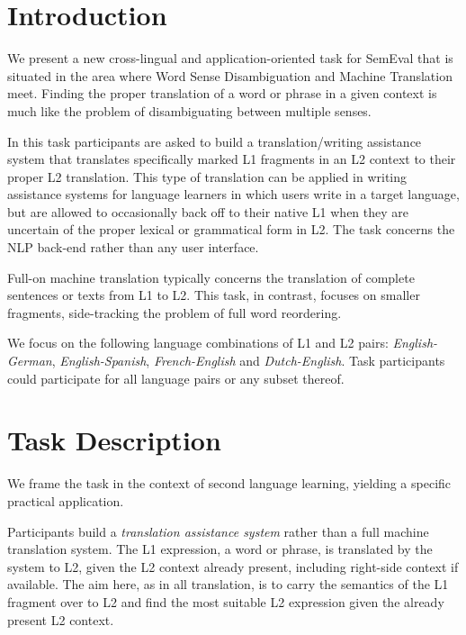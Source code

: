 \section{Introduction} %


We present a new cross-lingual and application-oriented task for SemEval that
is situated in the area where Word Sense Disambiguation and Machine Translation
meet. Finding the proper translation of a word or phrase in a given context is
much like the problem of disambiguating between multiple senses.

In this task participants are asked to build a translation/writing assistance
system that translates specifically marked L1 fragments in an L2 context to
their proper L2 translation. This type of translation can be applied in writing
assistance systems for language learners in which users write in a target
language, but are allowed to occasionally back off to their native L1 when they
are uncertain of the proper lexical or grammatical form in L2. The task
concerns the NLP back-end rather than any user interface.

Full-on machine translation typically concerns the translation of complete
sentences or texts from L1 to L2. This task, in contrast, focuses on smaller
fragments, side-tracking the problem of full word reordering.


We focus on the following language combinations of L1 and L2 pairs:
\emph{English-German}, \emph{English-Spanish}, \emph{French-English} and
\emph{Dutch-English}. Task participants could participate for all language
pairs or any subset thereof.


\section{Task Description}

We frame the task in the context of second language learning, yielding a
specific practical application.

Participants build a \emph{translation assistance system}\/ rather than a full
machine translation system. The L1 expression, a word or phrase, is translated
by the system to L2, given the L2 context already present, including right-side
context if available. The aim here, as in all translation, is to carry the
semantics of the L1 fragment over to L2 and find the most suitable L2
expression given the already present L2 context.

